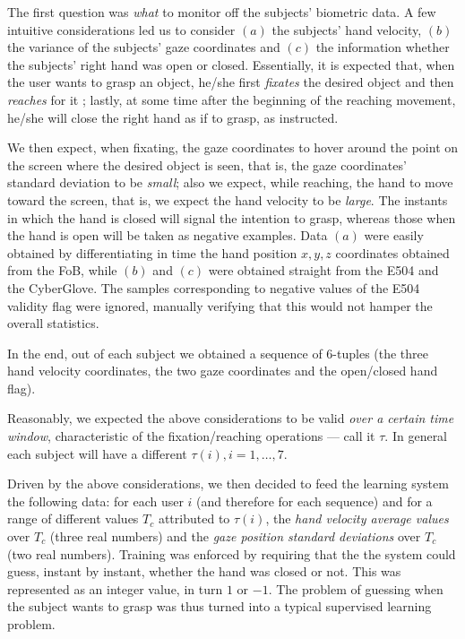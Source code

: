 \documentclass[a4paper,10pt,conference]{ieeeconf}
\begin{document}
The first question was \emph{what} to monitor off the subjects'
biometric data. A few intuitive considerations led us to consider
$(a)$ the subjects' hand velocity, $(b)$ the variance of the subjects'
gaze coordinates and $(c)$ the information whether the subjects' right
hand was open or closed. Essentially, it is expected that, when the
user wants to grasp an object, he/she first \emph{fixates} the desired
object and then \emph{reaches} for it \cite{...}; lastly, at some time
after the beginning of the reaching movement, he/she will close the
right hand as if to grasp, as instructed.

We then expect, when fixating, the gaze coordinates to hover around
the point on the screen where the desired object is seen, that is, the
gaze coordinates' standard deviation to be \emph{small}; also we
expect, while reaching, the hand to move toward the screen, that is,
we expect the hand velocity to be \emph{large}. The instants in which
the hand is closed will signal the intention to grasp, whereas those
when the hand is open will be taken as negative examples. Data $(a)$
were easily obtained by differentiating in time the hand position
$x,y,z$ coordinates obtained from the FoB, while $(b)$ and $(c)$ were
obtained straight from the E504 and the CyberGlove. The samples
corresponding to negative values of the E504 validity flag were
ignored, manually verifying that this would not hamper the overall
statistics.

In the end, out of each subject we obtained a sequence of $6$-tuples
(the three hand velocity coordinates, the two gaze coordinates and the
open/closed hand flag).

Reasonably, we expected the above considerations to be valid
\emph{over a certain time window}, characteristic of the
fixation/reaching operations --- call it $\tau$. In general each
subject will have a different $\tau(i), i=1,\ldots,7$.

Driven by the above considerations, we then decided to feed the
learning system the following data: for each user $i$ (and therefore
for each sequence) and for a range of different values $T_c$
attributed to $\tau(i)$, the \emph{hand velocity average values} over
$T_c$ (three real numbers) and the \emph{gaze position standard
deviations} over $T_c$ (two real numbers). Training was enforced by
requiring that the the system could guess, instant by instant, whether
the hand was closed or not. This was represented as an integer value,
in turn $1$ or $-1$. The problem of guessing when the subject wants to
grasp was thus turned into a typical supervised learning problem.
\end{document}
